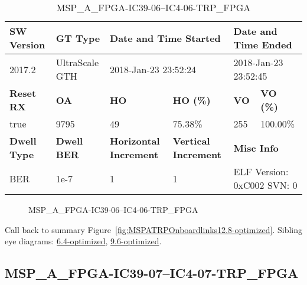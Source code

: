 \begin{table}[h]
\centering
\caption{MSP\_A\_FPGA-IC39-06--IC4-06-TRP\_FPGA}
\label{tab:MSPAFPGAIC3906IC406TRPFPGA12.8-optimized}
\begin{tabular}{@{}|l|l|l|l|l|l|@{}}
\toprule
\textbf{SW Version}                & \textbf{GT Type}   & \multicolumn{2}{l|}{\textbf{Date and Time Started}}            & \multicolumn{2}{l|}{\textbf{Date and Time Ended}}        \\ \midrule
2017.2                       & UltraScale GTH          & \multicolumn{2}{l|}{2018-Jan-23 23:52:24}                   & \multicolumn{2}{l|}{2018-Jan-23 23:52:45}               \\ \midrule
\textbf{Reset RX}                  & \textbf{OA} & \textbf{HO}   & \textbf{HO (\%)} & \textbf{VO} & \textbf{VO (\%)} \\ \midrule
true & 9795        & 49          & 75.38\%        & 255        & 100.00\%       \\ \midrule
\textbf{Dwell Type}                & \textbf{Dwell BER} & \textbf{Horizontal Increment} & \textbf{Vertical Increment}    & \multicolumn{2}{l|}{\textbf{Misc Info}}                  \\ \midrule
BER                            & 1e-7        & 1        & 1           & \multicolumn{2}{l|}{ELF Version: 0xC002 SVN: 0}                         \\ \bottomrule
\end{tabular}
\end{table}

\begin{figure}[h]
\caption{MSP\_A\_FPGA-IC39-06--IC4-06-TRP\_FPGA} \label{fig:MSPAFPGAIC3906IC406TRPFPGA12.8-optimized}
\end{figure}

Call back to summary Figure~\ref{fig:MSPATRPOnboardlinks12.8-optimized}.
Sibling eye diagrams: \hyperref[sec:MSPAFPGAIC3906IC406TRPFPGA6.4-optimized]{6.4-optimized}, \hyperref[sec:MSPAFPGAIC3906IC406TRPFPGA9.6-optimized]{9.6-optimized}.

\clearpage
\newpage


\subsection{MSP\_A\_FPGA-IC39-07--IC4-07-TRP\_FPGA}\label{sec:MSPAFPGAIC3907IC407TRPFPGA12.8-optimized}

